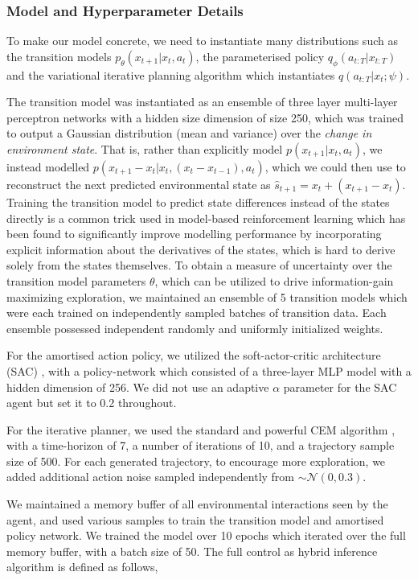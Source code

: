 \subsubsection{Model and Hyperparameter Details}

To make our model concrete, we need to instantiate many distributions such as the transition models $p_\theta(x_{t+1} | x_t, a_t)$, the parameterised policy $q_\phi(a_{t:T} | x_{t:T})$ and the variational iterative planning algorithm which instantiates $q(a_{t:T} | x_t; \psi)$.

The transition model was instantiated as an ensemble of three layer multi-layer perceptron networks with a hidden size dimension of size 250, which was trained to output a Gaussian distribution (mean and variance) over the \emph{change in environment state}. That is, rather than explicitly model $p(x_{t+1} |x_t, a_t)$, we instead modelled $p(x_{t+1} - x_t | x_t, (x_t - x_{t-1}), a_t)$, which we could then use to reconstruct the next predicted environmental state as $\hat{s}_{t+1} = x_t + (x_{t+1} - x_t)$. Training the transition model to predict state differences instead of the states directly is a common trick used in model-based reinforcement learning which has been found to significantly improve modelling performance by incorporating explicit information about the derivatives of the states, which is hard to derive solely from the states themselves. To obtain a measure of uncertainty over the transition model parameters $\theta$, which can be utilized to drive information-gain maximizing exploration, we maintained an ensemble of 5 transition models which were each trained on independently sampled batches of transition data. Each ensemble possessed independent randomly and uniformly initialized weights.

For the amortised action policy, we utilized the soft-actor-critic architecture (SAC) \citep{haarnoja2018soft}, with a policy-network which consisted of a three-layer MLP model with a hidden dimension of 256. We did not use an adaptive $\alpha$ parameter for the SAC agent but set it to 0.2 throughout.

For the iterative planner, we used the standard and powerful CEM algorithm \citep{de2005tutorial}, with a time-horizon of 7, a number of iterations of 10, and a trajectory sample size of 500. For each generated trajectory, to encourage more exploration, we added additional action noise sampled independently from $\sim \mathcal{N}(0, 0.3)$.

We maintained a memory buffer of all environmental interactions seen by the agent, and used various samples to train the transition model and amortised policy network. We trained the model over 10 epochs which iterated over the full memory buffer, with a batch size of 50. The full control as hybrid inference algorithm is defined as follows,
\newline 

